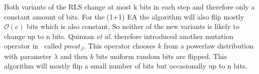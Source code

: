 Both variants of the RLS change at most k bits in each step and therefore only a constant amount of bits. For the (1+1) EA the algorithm will also flip mostly $\mathcal{O}(c)$ bits which is also constant. So neither of the new variants is likely to change up to n bits. Quinzan \textit{et al.} therefore introduced another mutation operator in~\cite{friedrich2018evolutionary} called $pmut_\beta$. This operator chooses $k$ from a powerlaw distribution with parameter $\lambda$ and then $k$ bits uniform random bits are flipped. This algorithm will mostly flip a small number of bits but occasionally up to n bits.